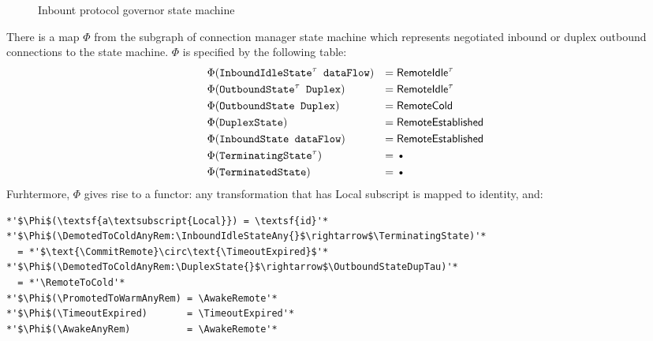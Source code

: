 \begin{figure}[h]
  \caption{Inbount protocol governor state machine}
  \label{fig:inbgov-state-machine}
\end{figure}

There is a map \(\Phi\) from the subgraph of connection manager state machine
which represents negotiated inbound or duplex outbound connections to the
\inbgov{} state machine. \(\Phi\) is specified by the following table:
\begin{align*}
  & \Phi(\text{\InboundIdleStateAny}) & =\; & \text{\RemoteIdle}\\
  & \Phi(\text{\OutboundStateDupTau}) & =\; & \text{\RemoteIdle}\\
  & \Phi(\text{\OutboundStateDup})    & =\; & \text{\RemoteCold} \\
  & \Phi(\text{\DuplexState})         & =\; & \text{\RemoteEstablished} \\
  & \Phi(\text{\InboundStateAny})     & =\; & \text{\RemoteEstablished} \\
  & \Phi(\text{\TerminatingState})    & =\; & \text{\FinalState} \\
  & \Phi(\text{\TerminatedState})     & =\; & \text{\FinalState} \\
\end{align*}
Furhtermore, \(\Phi\) gives rise to a functor: any transformation that has
\textsf{Local} subscript is mapped to identity, and:
\begin{lstlisting}
*'$\Phi$(\textsf{a\textsubscript{Local}}) = \textsf{id}'*
*'$\Phi$(\DemotedToColdAnyRem:\InboundIdleStateAny{}$\rightarrow$\TerminatingState)'*
  = *'$\text{\CommitRemote}\circ\text{\TimeoutExpired}$'*
*'$\Phi$(\DemotedToColdAnyRem:\DuplexState{}$\rightarrow$\OutboundStateDupTau)'*
  = *'\RemoteToCold'*
*'$\Phi$(\PromotedToWarmAnyRem) = \AwakeRemote'*
*'$\Phi$(\TimeoutExpired)       = \TimeoutExpired'*
*'$\Phi$(\AwakeAnyRem)          = \AwakeRemote'*
\end{lstlisting}

